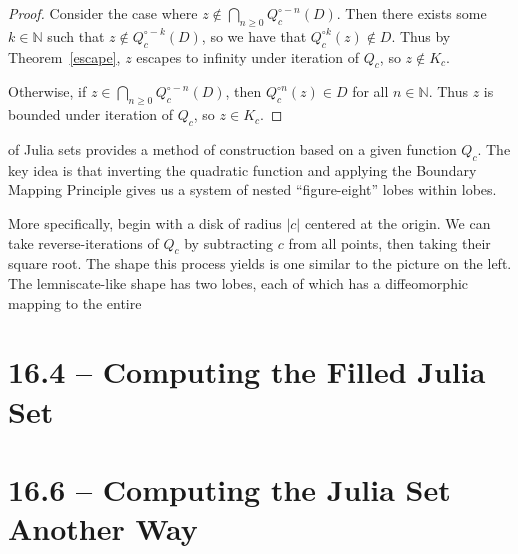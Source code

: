 \documentclass[symmetric]{tufte-handout}
\begin{document}
\begin{proof}
    Consider the case where
    $z\notin \bigcap_{n\ge 0} Q_c^{\circ -n} (D)$.
    Then there exists some $k\in \mathbb{N}$ such that $z\notin Q_c^{\circ -k} (D)$,
    so we have that $Q_c^{\circ k}(z) \notin D$. 
    Thus by Theorem~\ref{escape}, $z$ escapes to infinity under iteration
    of $Q_c$, so $z\notin K_c$.  

    Otherwise, if $z\in \bigcap_{n\ge 0} Q_c^{\circ -n} (D)$, then 
     $Q_c^{\circ n}(z) \in D$ for all $n\in \mathbb{N}$. Thus $z$ is bounded under
     iteration of $Q_c$, so $z\in K_c$.
\end{proof}

 of Julia sets provides a method of construction based on 
a given function $Q_c$. The key idea is that inverting the quadratic function and 
applying the Boundary Mapping Principle gives us a system of nested ``figure-eight''
lobes within lobes.

More specifically, begin with a disk of radius $|c|$ centered at the origin. We can take reverse-iterations of $Q_c$ by subtracting $c$ from all points, then taking their square root. The shape this process yields is one similar to the picture on the left. The lemniscate-like shape has two lobes, each of which has a diffeomorphic mapping to the entire 



\section{16.4 -- Computing the Filled Julia Set}\label{sec:problem-1}










\section{16.6 -- Computing the Julia Set Another Way}\label{sec:problem-1}
\end{document}

